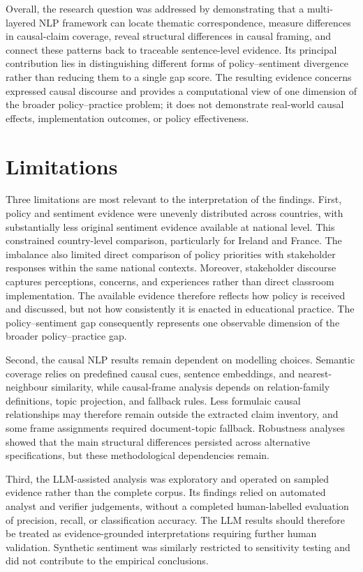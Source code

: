 Overall, the research question was addressed by demonstrating that a multi-layered
NLP framework can locate thematic correspondence, measure differences in causal-claim
coverage, reveal structural differences in causal framing, and connect these patterns
back to traceable sentence-level evidence. Its principal contribution lies in
distinguishing different forms of policy--sentiment divergence rather than reducing
them to a single gap score. The resulting evidence concerns expressed causal
discourse and provides a computational view of one dimension of the broader
policy--practice problem; it does not demonstrate real-world causal effects,
implementation outcomes, or policy effectiveness.

\section{Limitations}

Three limitations are most relevant to the interpretation of the findings. First,
policy and sentiment evidence were unevenly distributed across countries, with
substantially less original sentiment evidence available at national level.
This constrained country-level comparison, particularly for Ireland and France.
The imbalance also limited direct comparison of policy priorities with stakeholder
responses within the same national contexts. Moreover, stakeholder discourse captures
perceptions, concerns, and experiences rather than direct classroom implementation.
The available evidence therefore reflects how policy is received and discussed,
but not how consistently it is enacted in educational practice. The
policy--sentiment gap consequently represents one observable dimension of the broader
policy--practice gap.

Second, the causal NLP results remain dependent on modelling choices. Semantic
coverage relies on predefined causal cues, sentence embeddings, and
nearest-neighbour similarity, while causal-frame analysis depends on relation-family
definitions, topic projection, and fallback rules. Less formulaic causal relationships may therefore
remain outside the extracted claim inventory, and some frame assignments required
document-topic fallback. Robustness analyses showed that the main structural
differences persisted across alternative specifications, but these methodological
dependencies remain.

Third, the LLM-assisted analysis was exploratory and operated on sampled evidence
rather than the complete corpus. Its findings relied on automated analyst and
verifier judgements, without a completed human-labelled evaluation of precision,
recall, or classification accuracy. The LLM results should therefore be treated as
evidence-grounded interpretations requiring further human validation. Synthetic
sentiment was similarly restricted to sensitivity testing and did not contribute to
the empirical conclusions.

